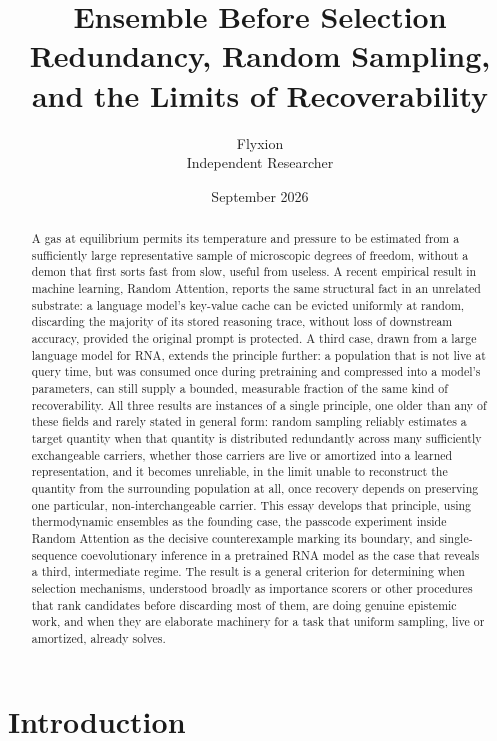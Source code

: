 \documentclass[11pt]{article}
\title{Ensemble Before Selection \\ \large Redundancy, Random Sampling, and the Limits of Recoverability}
\author{Flyxion \\ \small Independent Researcher}
\date{September 2026}
\begin{document}
\maketitle

\begin{abstract}
A gas at equilibrium permits its temperature and pressure to be estimated from a sufficiently large representative sample of microscopic degrees of freedom, without a demon that first sorts fast from slow, useful from useless. A recent empirical result in machine learning, Random Attention, reports the same structural fact in an unrelated substrate: a language model's key-value cache can be evicted uniformly at random, discarding the majority of its stored reasoning trace, without loss of downstream accuracy, provided the original prompt is protected. A third case, drawn from a large language model for RNA, extends the principle further: a population that is not live at query time, but was consumed once during pretraining and compressed into a model's parameters, can still supply a bounded, measurable fraction of the same kind of recoverability. All three results are instances of a single principle, one older than any of these fields and rarely stated in general form: random sampling reliably estimates a target quantity when that quantity is distributed redundantly across many sufficiently exchangeable carriers, whether those carriers are live or amortized into a learned representation, and it becomes unreliable, in the limit unable to reconstruct the quantity from the surrounding population at all, once recovery depends on preserving one particular, non-interchangeable carrier. This essay develops that principle, using thermodynamic ensembles as the founding case, the passcode experiment inside Random Attention as the decisive counterexample marking its boundary, and single-sequence coevolutionary inference in a pretrained RNA model as the case that reveals a third, intermediate regime. The result is a general criterion for determining when selection mechanisms, understood broadly as importance scorers or other procedures that rank candidates before discarding most of them, are doing genuine epistemic work, and when they are elaborate machinery for a task that uniform sampling, live or amortized, already solves.
\end{abstract}

\section{Introduction}
\end{document}
